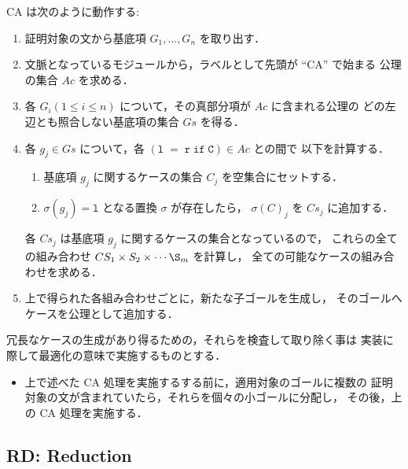\documentclass[a4paper,oneside,10pt,here]{memoir}
\begin{document}
CA は次のように動作する:
\begin{enumerate}
\item 証明対象の文から基底項 $G_1, \ldots, G_n$ を取り出す．
\item 文脈となっているモジュールから，ラベルとして先頭が ``CA'' で始まる
  公理の集合 $Ac$ を求める．
\item 各 $G_i (1\le i \le n)$ について，その真部分項が $Ac$ に含まれる公理の
  どの左辺とも照合しない基底項の集合 $Gs$ を得る．
\item 各 $g_j \in Gs$ について，各 $(\mathtt{l\; =\; r\; if\; C}) \in Ac$ との間で
  以下を計算する．
  \begin{enumerate}
  \item 基底項 $g_j$ に関するケースの集合 $C_j$ を空集合にセットする．
  \item $\sigma(g_j) = \mathtt{l}$ となる置換 $\sigma$ が存在したら，
    $\sigma(C)_j$ を $Cs_j$ に追加する．
  \end{enumerate}
  各 $Cs_j$ は基底項 $g_j$ に関するケースの集合となっているので，
  これらの全ての組み合わせ $CS_1 \times S_2 \times \cdots\S_m$ を計算し，
  全ての可能なケースの組み合わせを求める．
  \item 上で得られた各組み合わせごとに，新たな子ゴールを生成し，
    そのゴールへケースを公理として追加する．
\end{enumerate}
冗長なケースの生成があり得るための，それらを検査して取り除く事は
実装に際して最適化の意味で実施するものとする．

\begin{itemize}
\item 上で述べた CA 処理を実施するする前に，適用対象のゴールに複数の
  証明対象の文が含まれていたら，それらを個々の小ゴールに分配し，
  その後，上の CA 処理を実施する．
\end{itemize}

\subsection{RD: Reduction}\label{sec:RD}
\end{document}
